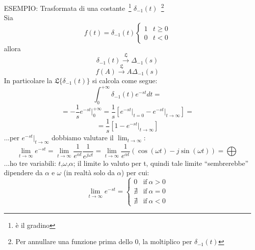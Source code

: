 \documentclass[a4paper]{report}
\begin{document}
ESEMPIO: Trasformata di una costante~\footnote{\`e il gradino}
$\delta_{-1}(t)$~\footnote{Per annullare una funzione prima dello 0,
  la moltiplico per $\delta_{-1}(t)$}\\
Sia
\begin{displaymath}
  f(t) = \delta_{-1}(t)\left\{
\begin{array}{ll}
  1 & t\ge0\\
  0&t<0
\end{array}\right.
\end{displaymath}
allora
\begin{displaymath}
  \delta_{-1}(t)\stackrel{\mathfrak{L}}{\longrightarrow}\Delta_{-1}(s)
\end{displaymath}
\begin{displaymath}
f(A)\stackrel{\mathfrak{L}}{\longrightarrow}A\Delta_{-1}(s)
\end{displaymath}
In particolare la $\mathfrak{L}\{\delta_{-1}(t)\}$ si calcola come segue:
\begin{equation}\label{eq:laptransfsca}
  \int_{0}^{+\infty}\delta_{-1}(t)e^{-st}dt=
\end{equation}
\begin{displaymath}
  = -\frac{1}{s}e^{-st}\Bigg |_{0}^{+\infty} =
  \frac{1}{s}\left[e^{-st}\Bigg |_{t=0} - e^{-st} \Bigg |_{t \to
      \infty} \right ]=
\end{displaymath}
\begin{displaymath}
  = \frac{1}{s}\left[1-e^{-st}\Bigg |_{t \to \infty}\right]
\end{displaymath}
...per $e^{-st}\Bigg |_{t \to \infty}$ dobbiamo valutare il $\lim_{t
  \to \infty}$: 
\begin{displaymath}
  \lim_{t \to \infty} e^{-st} = \lim_{t \to \infty} \frac{1}{e^{\alpha
      t}}\frac{1}{e^{j\omega t}} = \lim_{t \to
    \infty}\frac{1}{e^{\alpha t}}\left( \cos(\omega t)-j\sin(\omega
  t)\right) = \bigoplus
\end{displaymath}
...ho tre variabili: $t$,$\omega$,$\alpha$; il limite lo valuto per t,
quindi tale limite ``sembrerebbe'' dipendere da $\alpha$ e $\omega$
(in realt\`a solo da $\alpha$) per cui:
\begin{displaymath}
  \lim_{t \to \infty}e^{-st} = \left\{
  \begin{array}{ll}
    0 & \textrm{if} ~\alpha >0 \\
    \nexists & \textrm{if} ~\alpha =0\\
    \nexists & \textrm{if} ~\alpha <0
  \end{array}\right.
\end{displaymath}
\end{document}

